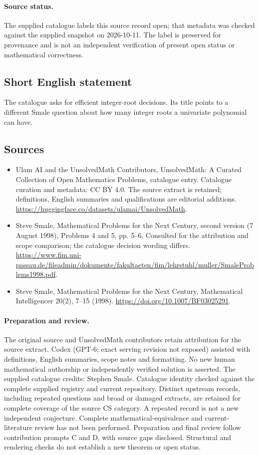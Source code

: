 \documentclass[11pt]{article}
\begin{document}
\paragraph{Source status.}
The supplied catalogue labels this source record open; that metadata was checked against the supplied snapshot on 2026-10-11. The label is preserved for provenance and is not an independent verification of present open status or mathematical correctness.
\subsection{Short English statement}
The catalogue asks for efficient integer-root decisions. Its title points to a different Smale question about how many integer roots a univariate polynomial can have.
\subsection{Sources}
\begin{itemize}
\item[\hypertarget{source:statement:1}{S1}] Ulam AI and the UnsolvedMath Contributors, UnsolvedMath: A Curated Collection of Open Mathematics Problems, catalogue entry. Catalogue curation and metadata: CC BY 4.0. The source extract is retained; definitions, English summaries and qualifications are editorial additions.
\url{https://huggingface.co/datasets/ulamai/UnsolvedMath}.
\item[\hypertarget{source:statement:2}{S2}] Steve Smale, Mathematical Problems for the Next Century, second version (7 August 1998), Problems 4 and 5, pp. 5--6. Consulted for the attribution and scope comparison; the catalogue decision wording differs.
\url{https://www.fim.uni-passau.de/fileadmin/dokumente/fakultaeten/fim/lehrstuhl/muller/SmaleProblems1998.pdf}.
\item[\hypertarget{source:statement:3}{S3}] Steve Smale, Mathematical Problems for the Next Century, Mathematical Intelligencer 20(2), 7--15 (1998).
\url{https://doi.org/10.1007/BF03025291}.
\end{itemize}
\paragraph{Preparation and review.}
The original source and UnsolvedMath contributors retain attribution for the source extract. Codex (GPT-6; exact serving revision not exposed) assisted with definitions, English summaries, scope notes and formatting. No new human mathematical authorship or independently verified solution is asserted. The supplied catalogue credits: Stephen Smale. Catalogue identity checked against the complete supplied registry and current repository. Distinct upstream records, including repeated questions and broad or damaged extracts, are retained for complete coverage of the source CS category. A repeated record is not a new independent conjecture. Complete mathematical-equivalence and current-literature review has not been performed. Preparation and final review follow contribution prompts C and D, with source gaps disclosed. Structural and rendering checks do not establish a new theorem or open status.
\label{end:statement}
\end{document}
